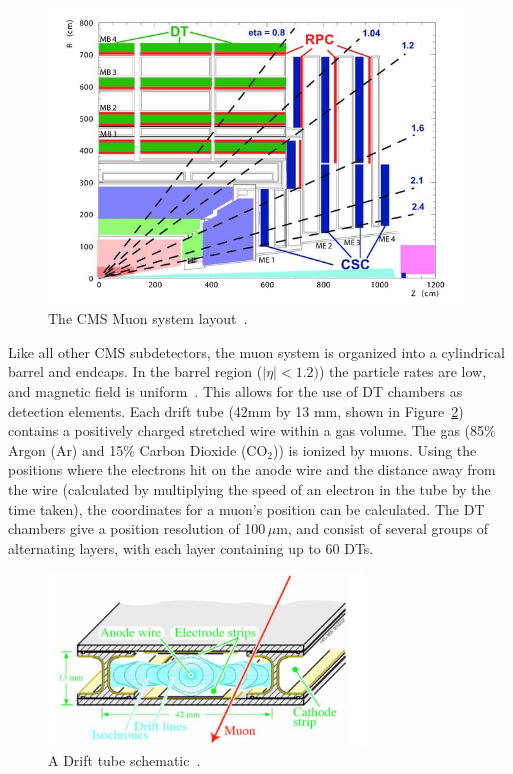 \begin{figure}
  \begin{center}
    \captionsetup{justification=centering}
  \includegraphics[width=0.98\textwidth,keepaspectratio]{plots_and_figures/chapter3/muon_system_layout.jpg}
\caption{The CMS Muon system layout~\cite{muon1}.}
\label{fig:muon_system_layout}
\end{center}
\end{figure}

Like all other CMS subdetectors, the muon system is organized into a cylindrical barrel and endcaps. In the barrel region ($|\eta|<1.2)$) the particle rates are low, and magnetic field is uniform~\cite{cms_exp_ref}. This allows for the use of DT chambers as detection elements. Each drift tube (42mm by 13 mm, shown in Figure~\ref{fig:drift_tube}) contains a positively charged stretched wire within a gas volume. The gas (85\% Argon (Ar) and 15\% Carbon Dioxide ($\mathrm{CO}_{2}$)) is ionized by muons. Using the positions where the electrons hit on the anode wire and the distance away from the wire (calculated by multiplying the speed of an electron in the tube by the time taken), the coordinates for a muon's position can be calculated. The DT chambers give a position resolution of 100\,$\mu$m, and consist of several groups of alternating layers, with each layer containing up to 60 DTs.      

\begin{figure}
  \begin{center}
    \captionsetup{justification=centering}
  \includegraphics[width=0.75\textwidth,keepaspectratio]{plots_and_figures/chapter3/drift_tube.png}
\caption{A Drift tube schematic~\cite{cms_exp_ref}.}
\label{fig:drift_tube}
\end{center}
\end{figure}

